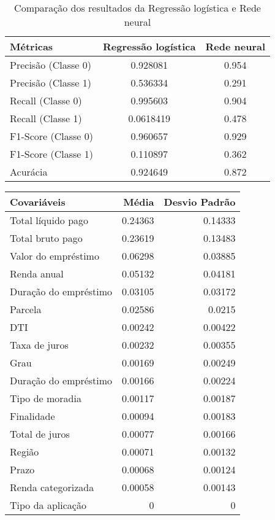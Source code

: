 \begin{table}[H]
  \centering
  \begin{tabular}{lcc}
    \hline
    \textbf{Métricas} & \textbf{Regressão logística} & \textbf{Rede neural} \\
    \hline
    Precisão (Classe 0) & 0.928081                     & \cellcolor{green!25}0.954 \\
    Precisão (Classe 1) & \cellcolor{green!25}0.536334 & 0.291 \\
    Recall   (Classe 0) & \cellcolor{green!25}0.995603 & 0.904 \\
    Recall   (Classe 1) & 0.0618419                    & \cellcolor{green!25}0.478 \\
    F1-Score (Classe 0) & \cellcolor{green!25} 0.960657  & 0.929 \\
    F1-Score (Classe 1) & 0.110897                     & \cellcolor{green!25}0.362 \\
    Acurácia            & \cellcolor{green!25}0.924649   & 0.872 \\
    \hline
  \end{tabular}
  \caption{Comparação dos resultados da Regressão logística e Rede neural}
  \label{tab:comparison_results}
\end{table}

\begin{table}[H]
\centering
\begin{tabular}{lrr}
  \hline
  Covariáveis               &   Média &   Desvio Padrão \\
  \hline
   Total líquido pago    & 0.24363 &         0.14333 \\
   Total bruto pago      & 0.23619 &         0.13483 \\
   Valor do empréstimo   & 0.06298 &         0.03885 \\
   Renda anual           & 0.05132 &         0.04181 \\
   Duração do empréstimo & 0.03105 &         0.03172 \\
   Parcela               & 0.02586 &         0.0215  \\
   DTI                   & 0.00242 &         0.00422 \\
   Taxa de juros         & 0.00232 &         0.00355 \\
   Grau                  & 0.00169 &         0.00249 \\
   Duração do empréstimo & 0.00166 &         0.00224 \\
   Tipo de moradia       & 0.00117 &         0.00187 \\
   Finalidade            & 0.00094 &         0.00183 \\
   Total de juros        & 0.00077 &         0.00166 \\
   Região                & 0.00071 &         0.00132 \\
   Prazo                 & 0.00068 &         0.00124 \\
   Renda categorizada    & 0.00058 &         0.00143 \\
   Tipo da aplicação     & 0       &         0       \\
  \hline
  \end{tabular}
\end{table}

